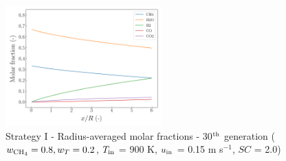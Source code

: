 \documentclass[preprint,12pt]{elsarticle}
\begin{document}
\begin{figure}[h!]
\centering
\includegraphics[width=60mm]{results/5/80C_20T/GEN30-AVG.png}
\caption{\label{fig:5R8020G30-avg} Strategy I - Radius-averaged molar fractions -  30$^{\rm{th}}$ generation ($w_{\rm{CH_4}} = 0.8, w_T = 0.2$, $T_{\rm{in}}$ = 900 K, $u_{\rm{in}}$ = 0.15 m s$^{-1}$, $SC$ = 2.0)}
\end{figure}
\end{document}
